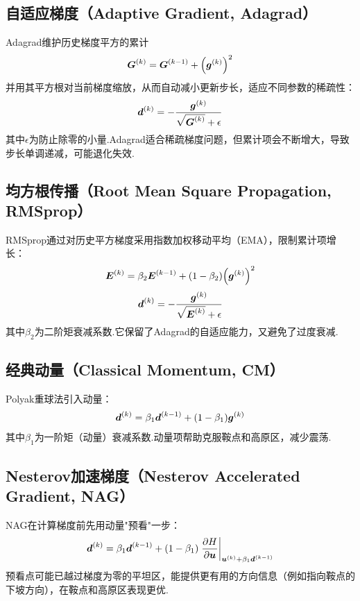 \documentclass[UTF8]{article}
\numberwithin{equation}{section}
\begin{document}
        \subsection{自适应梯度（Adaptive Gradient, Adagrad）}
            Adagrad维护历史梯度平方的累计
            \begin{align}
                \vb*{G}^\pqty{k}=\vb*{G}^\pqty{k-1}+\pqty{\vb*{g}^\pqty{k}}^2
            \end{align}
            并用其平方根对当前梯度缩放，从而自动减小更新步长，适应不同参数的稀疏性：
            \begin{align}
                \vb*{d}^\pqty{k}=-\frac{\vb*{g}^\pqty{k}}{\sqrt{\vb*{G}^\pqty{k}}+\epsilon}
            \end{align}
            其中$\epsilon$为防止除零的小量.Adagrad适合稀疏梯度问题，但累计项会不断增大，导致步长单调递减，可能退化失效.
        \subsection{均方根传播（Root Mean Square Propagation, RMSprop）}
            RMSprop通过对历史平方梯度采用指数加权移动平均（EMA），限制累计项增长：
            \begin{align}
                \vb*{E}^\pqty{k}=\beta_2\vb*{E}^\pqty{k-1}+\pqty{1-\beta_2}\pqty{\vb*{g}^\pqty{k}}^2
            \end{align}
            \begin{align}
                \vb*{d}^\pqty{k}=-\frac{\vb*{g}^\pqty{k}}{\sqrt{\vb*{E}^\pqty{k}}+\epsilon}
            \end{align}
            其中$\beta_2$为二阶矩衰减系数.它保留了Adagrad的自适应能力，又避免了过度衰减.
        \subsection{经典动量（Classical Momentum, CM）}
            Polyak重球法引入动量：
            \begin{align}
                \vb*{d}^\pqty{k}=\beta_1\vb*{d}^\pqty{k-1}+\pqty{1-\beta_1}\vb*{g}^\pqty{k}
            \end{align}
            其中$\beta_1$为一阶矩（动量）衰减系数.动量项帮助克服鞍点和高原区，减少震荡.
        \subsection{Nesterov加速梯度（Nesterov Accelerated Gradient, NAG）}
            NAG在计算梯度前先用动量"预看"一步：
            \begin{align}
                \vb*{d}^\pqty{k}=\beta_1\vb*{d}^\pqty{k-1}+\pqty{1-\beta_1}\eval{\pdv{H}{\vb*{u}}}_{\vb*{u}^\pqty{k}+\beta_1\vb*{d}^\pqty{k-1}}
            \end{align}
            预看点可能已越过梯度为零的平坦区，能提供更有用的方向信息（例如指向鞍点的下坡方向），在鞍点和高原区表现更优.
\end{document}
